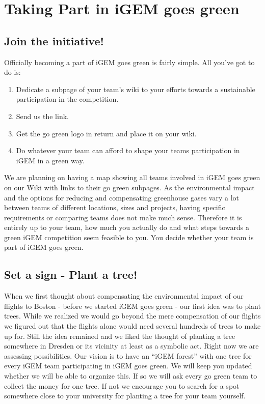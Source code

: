 
\chapter{Taking Part in iGEM goes green}\label{chap:takingpart}

\section{Join the initiative!}
Officially becoming a part of iGEM goes green is fairly simple. All you've got to do is:
\begin{enumerate}
	\item Dedicate a subpage of your team's wiki to your efforts towards a sustainable participation in the competition. 
	\item Send us the link.
	\item Get the go green logo in return and place it on your wiki.
	\item Do whatever your team can afford to shape your teams participation in iGEM in a green way.
	
\end{enumerate}
We are planning on having a map showing all teams involved in iGEM goes green on our Wiki with links to their go green subpages. As the environmental impact and the options for reducing and compensating greenhouse gases vary a lot between teams of different locations, sizes and projects, having specific requirements or comparing teams does not make much sense. Therefore it is entirely up to your team, how much you actually do and what steps towards a green iGEM competition seem feasible to you. You decide whether your team is part of iGEM goes green.


\section{Set a sign - Plant a tree!}\label{sec:trees}

When we first thought about compensating the environmental impact of our flights to Boston - before we started iGEM goes green - our first idea was to plant trees. While we realized we would go beyond the mere compensation of our flights we figured out that the flights alone would need several hundreds of trees to make up for. Still the idea remained and we liked the thought of planting a tree somewhere in Dresden or its vicinity at least as a symbolic act. Right now we are assessing possibilities. Our vision is to have an ``iGEM forest'' with one tree for every iGEM team participating in iGEM goes green. We will keep you updated whether we will be able to organize this. If so we will ask every go green team to collect the money for one tree. If not we encourage you to search for a spot somewhere close to your university for planting a tree for your team yourself.

